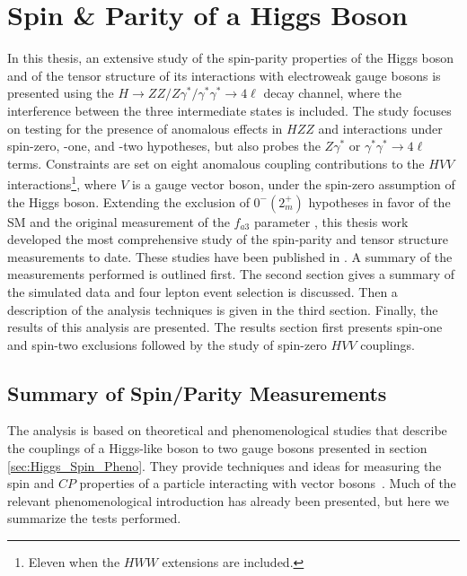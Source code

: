 \chapter{Spin \& Parity of a Higgs Boson}
\label{sec:Spin_Experiment}

In this thesis, an extensive study of the spin-parity properties of the Higgs boson and of the tensor structure of its interactions with electroweak gauge bosons is presented using the $H \to ZZ/Z\gamma^*/\gamma^*\gamma^*\to4\ell$ decay channel, where the interference between the three intermediate states is included. The study focuses on testing for the presence of anomalous effects in $HZZ$ and interactions under spin-zero, -one, and -two hypotheses, but also probes the $Z\gamma^*$ or $\gamma^*\gamma^*\to4\ell$ terms. Constraints are set on eight anomalous coupling contributions to the $HVV$ interactions\footnote{Eleven when the $HWW$ extensions are included.}, where $V$ is a gauge vector boson, under the spin-zero assumption of the Higgs boson. Extending the exclusion of $0^{-}\left(2_{m}^{+}\right)$ hypotheses in favor of the SM and the original measurement of the $f_{a3}$ parameter \cite{Chatrchyan:2012jja}, this thesis work developed the most comprehensive study of the spin-parity and tensor structure measurements to date. These studies have been published in \cite{Chatrchyan:2013mxa, Khachatryan:2014kca}. A summary of the measurements performed is outlined first. The second section gives a summary of the simulated data and four lepton event selection is discussed. Then a description of the analysis techniques is given in the third section. Finally, the results of this analysis are presented. The results section first presents spin-one and spin-two exclusions followed by the study of spin-zero $HVV$ couplings.

\section{Summary of Spin/Parity Measurements}
\label{sec:General_Spin_Parity}

The analysis is based on theoretical and phenomenological studies that describe the couplings of a Higgs-like boson to two gauge bosons presented in section \ref{sec:Higgs_Spin_Pheno}. They provide techniques and ideas for measuring the spin and $CP$ properties of a particle interacting with vector bosons~\cite{Gao:2010qx,Bolognesi:2012mm,Anderson:2013afp}. Much of the relevant phenomenological introduction has already been presented, but here we summarize the tests performed.

